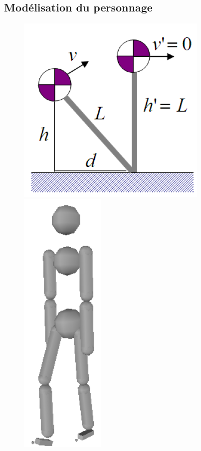 \documentclass{llncs}
\begin{document}
\subsection{Modélisation du personnage}
%
\begin{figure}[h]
\centering
\includegraphics[scale=0.5]{IPM.png}
\includegraphics[scale=0.5]{colli_primitives.png}

\end{figure}
\end{document}
